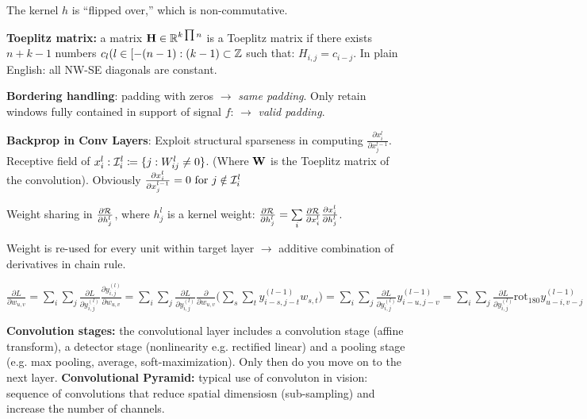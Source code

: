     The kernel $h$ is ``flipped over,'' which is non-commutative.
    
    \textbf{Toeplitz matrix:} a matrix $\mathbf H\in\mathbb R^{k\prod n}$ is a Toeplitz matrix if there exists $n+k-1$ numbers $c_l(l\in[-(n-1):(k-1) \subset \mathbb Z$ such that: $H_{i,j}=c_{i-j}$. In plain English: all NW-SE diagonals are constant.
    
    \textbf{Bordering handling}: padding with zeros $\xrightarrow{}$ \emph{same padding}. Only retain windows fully contained in support of signal $f$: $\xrightarrow{}$ \emph{valid padding}.
    
    \textbf{Backprop in Conv Layers}: Exploit structural sparseness in computing $\frac{\partial x^l_i}{\partial x^{l-1}_j}$. Receptive field of $x^l_i:\mathcal{I}^l_i\coloneqq\{j:W^l_{ij}\neq0\}$. (Where $\mathbf W$ is the Toeplitz matrix of the convolution). Obviously $\frac{\partial x^l_i}{\partial x^{l-1}_j}=0 \text{ for } j\notin\mathcal{I}^l_i$
    
    Weight sharing in $\frac{\partial\mathcal{R}}{\partial h^l_j}$, where $h^l_j$ is a kernel weight:
    $\frac{\partial\mathcal{R}}{\partial h^l_j}=\sum\limits_i\frac{\partial\mathcal{R}}{\partial x^l_i}\frac{\partial x^l_i}{\partial h^l_j}$.
    
    Weight is re-used for every unit within target layer $\xrightarrow{}$ additive combination of derivatives in chain rule.
    
    $\frac{\partial L}{\partial w_{u,v}}=\sum\limits_i \sum\limits_j \frac{\partial L}{\partial y_{i,j}^{(l)}} \frac{\partial y_{i,j}^{(l)}}{\partial w_{u,v}} = \sum\limits_i \sum\limits_j \frac{\partial L}{\partial y_{i,j}^{(l)}} \frac{\partial}{\partial w_{u,v}}\big(\sum\limits_s \sum\limits_t y_{i-s,j-t}^{(l-1)}w_{s,t}\big) = \sum\limits_i \sum\limits_j \frac{\partial L}{\partial y_{i,j}^{(l)}} y_{i-u,j-v}^{(l-1)} =  \sum\limits_i \sum\limits_j \frac{\partial L}{\partial y_{i,j}^{(l)}} \text{rot}_{180} y_{u-i,v-j}^{(l-1)}$
    
    
    
    \textbf{Convolution stages:} the convolutional layer includes a convolution stage (affine transform), a detector stage (nonlinearity e.g. rectified linear) and a pooling stage (e.g. max pooling, average, soft-maximization). Only then do you move on to the next layer. \textbf{Convolutional Pyramid:} typical use of convoluton in vision: sequence of convolutions that reduce spatial dimensiosn (sub-sampling) and increase the number of channels.
    
